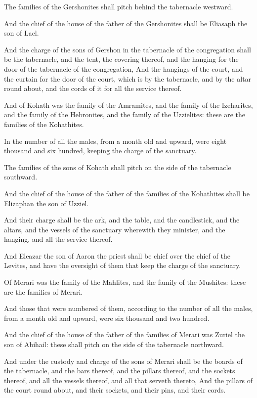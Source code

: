 \Verse The families of the Gershonites shall pitch behind the tabernacle
westward.

\Verse And the chief of the house of the father of the Gershonites shall
be Eliasaph the son of Lael.

\Verse And the charge of the sons of Gershon in the tabernacle of the
congregation shall be the tabernacle, and the tent, the covering
thereof, and the hanging for the door of the tabernacle of the
congregation, \Verse And the hangings of the court, and the curtain for
the door of the court, which is by the tabernacle, and by the altar
round about, and the cords of it for all the service thereof.

\Verse And of Kohath was the family of the Amramites, and the family of
the Izeharites, and the family of the Hebronites, and the family of
the Uzzielites: these are the families of the Kohathites.

\Verse In the number of all the males, from a month old and upward, were
eight thousand and six hundred, keeping the charge of the sanctuary.

\Verse The families of the sons of Kohath shall pitch on the side of the
tabernacle southward.

\Verse And the chief of the house of the father of the families of the
Kohathites shall be Elizaphan the son of Uzziel.

\Verse And their charge shall be the ark, and the table, and the
candlestick, and the altars, and the vessels of the sanctuary
wherewith they minister, and the hanging, and all the service thereof.

\Verse And Eleazar the son of Aaron the priest shall be chief over the
chief of the Levites, and have the oversight of them that keep the
charge of the sanctuary.

\Verse Of Merari was the family of the Mahlites, and the family of the
Mushites: these are the families of Merari.

\Verse And those that were numbered of them, according to the number of
all the males, from a month old and upward, were six thousand and two
hundred.

\Verse And the chief of the house of the father of the families of
Merari was Zuriel the son of Abihail: these shall pitch on the side of
the tabernacle northward.

\Verse And under the custody and charge of the sons of Merari shall be
the boards of the tabernacle, and the bars thereof, and the pillars
thereof, and the sockets thereof, and all the vessels thereof, and all
that serveth thereto, \Verse And the pillars of the court round about,
and their sockets, and their pins, and their cords.

